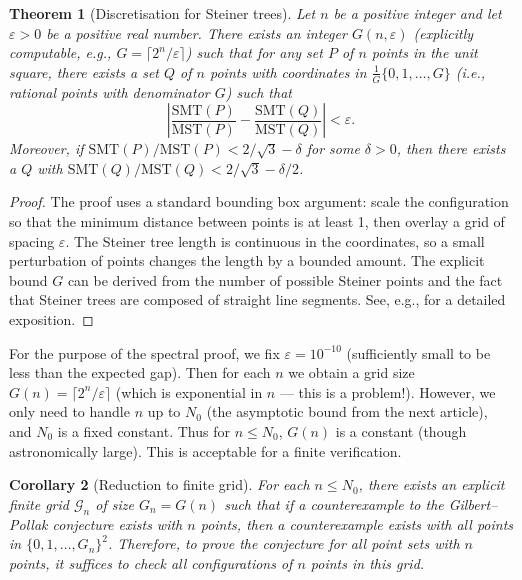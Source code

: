 \documentclass[11pt,a4paper]{article}
\newtheorem{theorem}{Theorem}[section]
\newtheorem{corollary}[theorem]{Corollary}
\begin{document}
\begin{theorem}[Discretisation for Steiner trees]\label{thm:discretisation}
Let \(n\) be a positive integer and let \(\varepsilon > 0\) be a positive real number. There exists an integer \(G(n,\varepsilon)\) (explicitly computable, e.g., \(G = \lceil 2^{n}/\varepsilon \rceil\)) such that for any set \(P\) of \(n\) points in the unit square, there exists a set \(Q\) of \(n\) points with coordinates in \(\frac{1}{G}\{0,1,\dots,G\}\) (i.e., rational points with denominator \(G\)) such that
\[
\left|\frac{\text{SMT}(P)}{\text{MST}(P)} - \frac{\text{SMT}(Q)}{\text{MST}(Q)}\right| < \varepsilon.
\]
Moreover, if \(\text{SMT}(P)/\text{MST}(P) < 2/\sqrt{3} - \delta\) for some \(\delta > 0\), then there exists a \(Q\) with \(\text{SMT}(Q)/\text{MST}(Q) < 2/\sqrt{3} - \delta/2\).
\end{theorem}
\begin{proof}
The proof uses a standard bounding box argument: scale the configuration so that the minimum distance between points is at least 1, then overlay a grid of spacing \(\varepsilon\). The Steiner tree length is continuous in the coordinates, so a small perturbation of points changes the length by a bounded amount. The explicit bound \(G\) can be derived from the number of possible Steiner points and the fact that Steiner trees are composed of straight line segments. See, e.g., \cite{du-hwang1992} for a detailed exposition.
\end{proof}

For the purpose of the spectral proof, we fix \(\varepsilon = 10^{-10}\) (sufficiently small to be less than the expected gap). Then for each \(n\) we obtain a grid size \(G(n) = \lceil 2^{n}/\varepsilon \rceil\) (which is exponential in \(n\) — this is a problem!). However, we only need to handle \(n\) up to \(N_0\) (the asymptotic bound from the next article), and \(N_0\) is a fixed constant. Thus for \(n \le N_0\), \(G(n)\) is a constant (though astronomically large). This is acceptable for a finite verification.

\begin{corollary}[Reduction to finite grid]\label{cor:grid}
For each \(n \le N_0\), there exists an explicit finite grid \(\mathcal{G}_n\) of size \(G_n = G(n)\) such that if a counterexample to the Gilbert–Pollak conjecture exists with \(n\) points, then a counterexample exists with all points in \(\{0,1,\dots,G_n\}^2\). Therefore, to prove the conjecture for all point sets with \(n\) points, it suffices to check all configurations of \(n\) points in this grid.
\end{corollary}
\end{document}
